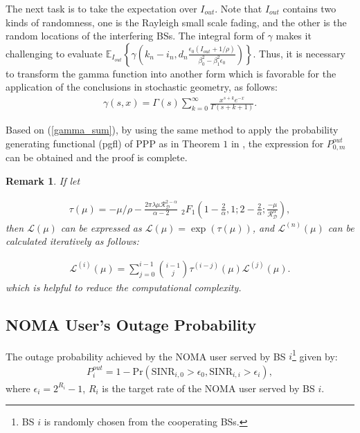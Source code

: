 \documentclass[10pt, doublecolumn]{IEEEtran}
\newtheorem{Remark}{Remark}
\newcommand{\Equ}[1]{
  \begin{align}
    #1
  \end{align}}
\begin{document}
\begin{IEEEproof}
The next task is to take the expectation over $I_{out}$. Note that $I_{out}$ contains two kinds of randomness, one is the Rayleigh small scale fading, and the other is the random locations of the interfering BSs. The integral form of $\gamma$ makes it challenging to evaluate $\mathbb{E}_{I_{out}}\left\{\gamma\left(k_n-i_n,d_n\frac{\epsilon_0(I_{out}+1/\rho)}{\beta_0^2-\beta_1^2\epsilon_0}\right)\right\}$.
Thus, it is necessary to transform the gamma function into another form which is favorable for the application of the conclusions in stochastic geometry, as follows:
\begin{align}\label{gamma_sum}
 \gamma(s,x)=\Gamma(s)\sum_{k=0}^{\infty}\frac{x^{s+k}e^{-x}}{\Gamma(s+k+1)}.
\end{align}

Based on (\ref{gamma_sum}), by using the same method to apply {\color{black}the probability generating functional (pgfl)} of PPP as in Theorem $1$ in \cite{sysmmwave2018}, the expression for $P_{0,m}^{out}$ can be obtained and the proof is complete.
\end{IEEEproof}
\begin{Remark}
If let
  \Equ{
     \tau(\mu)=-\mu /\rho -\frac{2\pi \lambda \mu \mathcal{R} _{\mathcal{D}}^{2-\alpha}}{\alpha -2}  \,\,_2F_1\left( 1-\frac{2}{\alpha},1;2-\frac{2}{\alpha};\frac{-\mu}{\mathcal{R} _{\mathcal{D}}^{\alpha}} \right),
  }
then $\mathcal{L}(\mu)$ can be expressed as $\mathcal{L}(\mu)=\exp(\tau(\mu))$, and $\mathcal{L}^{(n)}(\mu)$ can be calculated iteratively as follows:
\Equ{
  \mathcal {L}^{(i)}(\mu)=\sum _{j=0}^{i-1}{\binom{i-1 }{ j}}\tau ^{(i-j)}(\mu)\mathcal {L}^{(j)}(\mu).
}
which is helpful to reduce the computational complexity.
\end{Remark}
\subsection{NOMA User's Outage Probability}
The outage probability achieved by the NOMA user served by BS $i${\footnote{BS $i$ is randomly chosen from the cooperating BSs.}} given by:
\begin{align}\label{Def_P_i}
  P_{i}^{out}=1-\text{Pr}\left( \mathrm{SINR}_{i,0}>\epsilon _0,\mathrm{SINR}_{i,i}>\epsilon _i \right),
\end{align}
where $\epsilon_i=2^{R_i}-1$, $R_i$ is the target rate of the NOMA user served by BS $i$.
\end{document}
